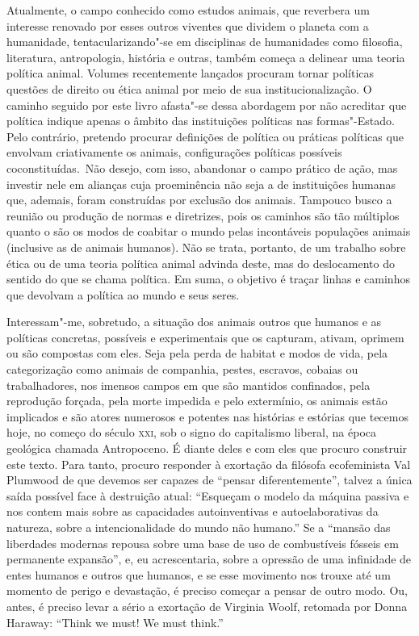 \begin{multicols}{2}
Atualmente, o campo conhecido como estudos animais, que reverbera um
interesse renovado por esses outros viventes que dividem o planeta com a
humanidade, tentacularizando"-se em disciplinas de humanidades como
filosofia, literatura, antropologia, história e outras, também começa a
delinear uma teoria política animal. Volumes recentemente lançados
procuram tornar políticas questões de direito ou ética animal por meio
de sua institucionalização. O caminho seguido por este livro afasta"-se
dessa abordagem por não acreditar que política indique apenas o âmbito
das instituições políticas nas formas"-Estado. Pelo contrário, pretendo
procurar definições de política ou práticas políticas que envolvam
criativamente os animais, configurações políticas possíveis
coconstituídas.~Não desejo, com isso, abandonar o campo prático de ação,
mas investir nele em alianças cuja proeminência não seja a de
instituições humanas que, ademais, foram construídas por exclusão dos
animais. Tampouco busco a reunião ou produção de normas e diretrizes,
pois os caminhos são tão múltiplos quanto o são os modos de coabitar o
mundo pelas incontáveis populações animais (inclusive as de animais
humanos). Não se trata, portanto, de um trabalho sobre ética ou de uma
teoria política animal advinda deste, mas do deslocamento do sentido do
que se chama política. Em suma, o objetivo é traçar linhas e caminhos
que devolvam a política ao mundo e seus seres.

Interessam"-me, sobretudo, a situação dos animais outros que humanos e as
políticas concretas, possíveis e experimentais que os capturam, ativam,
oprimem ou são compostas com eles. Seja pela perda de habitat e modos de
vida, pela categorização como animais de companhia, pestes, escravos,
cobaias ou trabalhadores, nos imensos campos em que são mantidos
confinados, pela reprodução forçada, pela morte impedida e pelo
extermínio, os animais estão implicados e são atores numerosos e
potentes nas histórias e estórias que tecemos hoje, no começo do século
\textsc{xxi}, sob o signo do capitalismo liberal, na época geológica chamada
Antropoceno. É diante deles e com eles que procuro construir este texto.
Para tanto, procuro responder à exortação da filósofa ecofeminista Val
Plumwood de que devemos ser capazes de ``pensar diferentemente'', talvez
a única saída possível face à destruição atual: ``Esqueçam o modelo da
máquina passiva e nos contem mais sobre as capacidades autoinventivas e
autoelaborativas da natureza, sobre a intencionalidade do mundo não
humano.'' Se a ``mansão
das liberdades modernas repousa sobre uma base de uso de combustíveis
fósseis em permanente expansão'', e, eu acrescentaria, sobre a opressão de uma infinidade
de entes humanos e outros que humanos, e se esse movimento nos trouxe
até um momento de perigo e devastação, é preciso começar a pensar de
outro modo. Ou, antes, é preciso levar a sério a exortação de Virginia
Woolf, retomada por Donna Haraway: ``Think we must! We must
think.''


\end{multicols}
